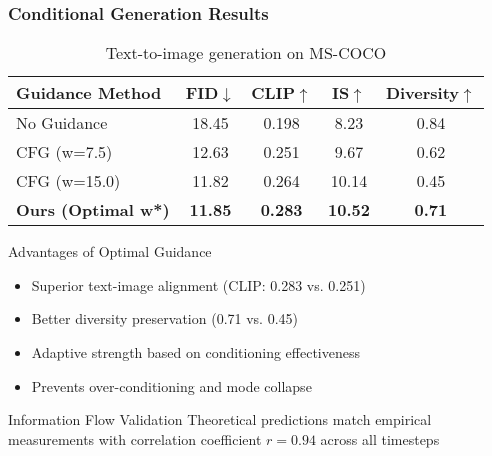 \documentclass[aspectratio=169]{beamer}
\begin{document}
\begin{frame}
\frametitle{Conditional Generation Results}
\begin{table}
\centering
\caption{Text-to-image generation on MS-COCO}
\begin{tabular}{l|ccc|c}
\hline
\textbf{Guidance Method} & FID$\downarrow$ & CLIP$\uparrow$ & IS$\uparrow$ & Diversity$\uparrow$ \\
\hline
No Guidance & 18.45 & 0.198 & 8.23 & 0.84 \\
CFG (w=7.5) & 12.63 & 0.251 & 9.67 & 0.62 \\
CFG (w=15.0) & 11.82 & 0.264 & 10.14 & 0.45 \\
\textbf{Ours (Optimal w*)} & \textbf{11.85} & \textbf{0.283} & \textbf{10.52} & \textbf{0.71} \\
\hline
\end{tabular}
\end{table}

\begin{block}{Advantages of Optimal Guidance}
\begin{itemize}
\item \textcolor{mygreen}{Superior text-image alignment} (CLIP: 0.283 vs. 0.251)
\item \textcolor{mygreen}{Better diversity preservation} (0.71 vs. 0.45)
\item \textcolor{mygreen}{Adaptive strength} based on conditioning effectiveness
\item \textcolor{mygreen}{Prevents over-conditioning} and mode collapse
\end{itemize}
\end{block}

\begin{block}{Information Flow Validation}
Theoretical predictions match empirical measurements with correlation coefficient $r = 0.94$ across all timesteps
\end{block}
\end{frame}
\end{document}
